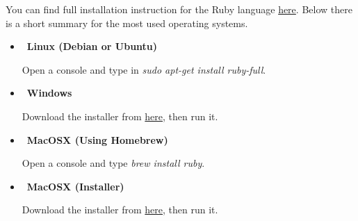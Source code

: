 You can find full installation instruction for the Ruby language \href{https://www.ruby-lang.org/en/documentation/installation/}{here}. Below there is a short summary for the most used operating systems.

\begin{itemize}
\item~\textbf{Linux (Debian or Ubuntu)}

Open a console and type in \emph{sudo apt-get install ruby-full}.

\item~\textbf{Windows}

Download the installer from \href{http://railsinstaller.org/en}{here}, then run it.

\item~\textbf{MacOSX (Using Homebrew)}

Open a console and type \emph{brew install ruby}.

\item~\textbf{MacOSX (Installer)}

Download the installer from \href{http://railsinstaller.org/en}{here}, then run it.
\end{itemize}